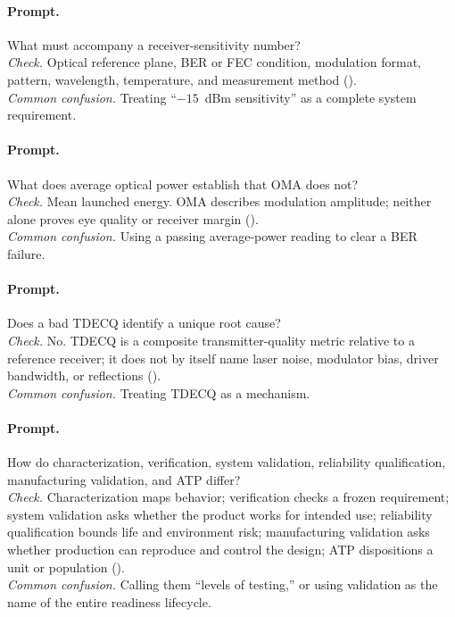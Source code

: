 \paragraph{Prompt.} What must accompany a receiver-sensitivity number?\\
\textit{Check.} Optical reference plane, BER or FEC condition, modulation
format, pattern, wavelength, temperature, and measurement method
().\\
\textit{Common confusion.} Treating ``$-15$~dBm sensitivity'' as a complete
system requirement.

\paragraph{Prompt.} What does average optical power establish that OMA does
not?\\
\textit{Check.} Mean launched energy. OMA describes modulation amplitude; neither
alone proves eye quality or receiver margin ().\\
\textit{Common confusion.} Using a passing average-power reading to clear a BER
failure.

\paragraph{Prompt.} Does a bad TDECQ identify a unique root cause?\\
\textit{Check.} No. TDECQ is a composite transmitter-quality metric relative to
a reference receiver; it does not by itself name laser noise, modulator bias,
driver bandwidth, or reflections ().\\
\textit{Common confusion.} Treating TDECQ as a mechanism.

\paragraph{Prompt.} How do characterization, verification, system validation,
reliability qualification, manufacturing validation, and ATP differ?\\
\textit{Check.} Characterization maps behavior; verification checks a frozen
requirement; system validation asks whether the product works for intended use;
reliability qualification bounds life and environment risk; manufacturing
validation asks whether production can reproduce and control the design; ATP
dispositions a unit or population
().\\
\textit{Common confusion.} Calling them ``levels of testing,'' or using
validation as the name of the entire readiness lifecycle.

